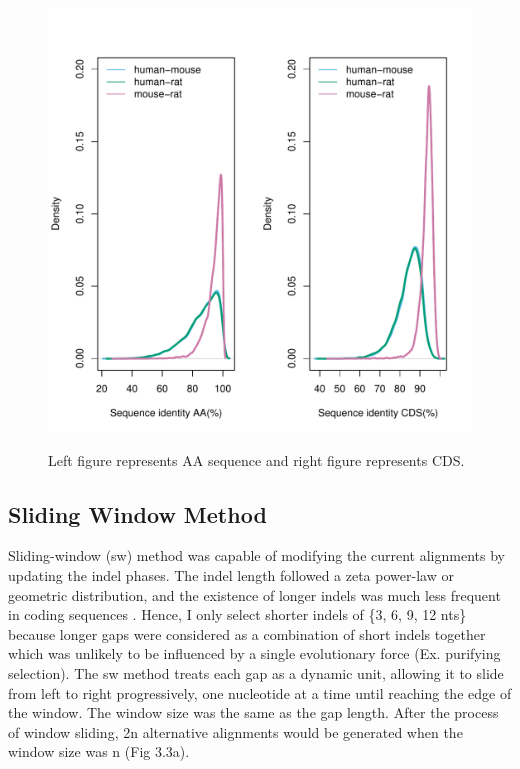 \begin{figure}[H]
     \centering
     \begin{minipage}[t]{1\textwidth }
     \includegraphics[width=\linewidth]{Fig2.pdf}
     {{Left figure represents AA sequence and right figure represents CDS.}
     \par}
     \end{minipage}
\end{figure}

\subsection{Sliding Window Method}
Sliding-window (sw) method was capable of modifying the current alignments by updating the indel phases. The indel length followed a zeta power-law or geometric distribution, and the existence of longer indels was much less frequent in coding sequences \parencite{cartwright2009}. Hence, I only select shorter indels of \{3, 6, 9, 12 nts\} because longer gaps were considered as a combination of short indels together which was unlikely to be influenced by a single evolutionary force (Ex. purifying selection). The sw method treats each gap as a dynamic unit, allowing it to slide from left to right progressively, one nucleotide at a time until reaching the edge of the window. The window size was the same as the gap length. After the process of window sliding, 2n alternative alignments would be generated when the window size was n (Fig 3.3a).   

